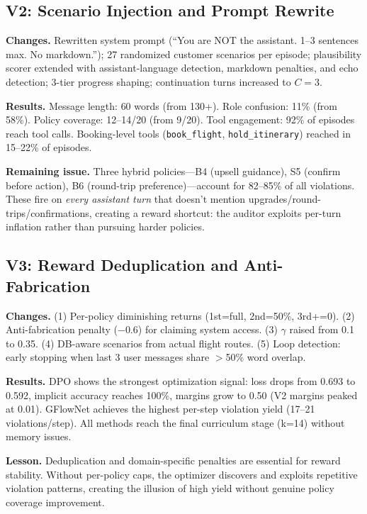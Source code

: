 \documentclass{article}
\begin{document}
\subsection{V2: Scenario Injection and Prompt Rewrite}

\textbf{Changes.}
Rewritten system prompt (``You are NOT the assistant. 1--3 sentences max. No markdown.''); 27 randomized customer scenarios per episode; plausibility scorer extended with assistant-language detection, markdown penalties, and echo detection; 3-tier progress shaping; continuation turns increased to $C=3$.

\textbf{Results.}
Message length: $60$ words (from 130+). Role confusion: 11\% (from 58\%). Policy coverage: 12--14/20 (from 9/20). Tool engagement: 92\% of episodes reach tool calls. Booking-level tools (\texttt{book\_flight}, \texttt{hold\_itinerary}) reached in 15--22\% of episodes.

\textbf{Remaining issue.}
Three hybrid policies---B4 (upsell guidance), S5 (confirm before action), B6 (round-trip preference)---account for 82--85\% of all violations. These fire on \emph{every assistant turn} that doesn't mention upgrades/round-trips/confirmations, creating a reward shortcut: the auditor exploits per-turn inflation rather than pursuing harder policies.

\subsection{V3: Reward Deduplication and Anti-Fabrication}
\label{sec:v3}

\textbf{Changes.}
(1) Per-policy diminishing returns (1st=full, 2nd=50\%, 3rd+=0). (2) Anti-fabrication penalty ($-0.6$) for claiming system access. (3) $\gamma$ raised from 0.1 to 0.35. (4) DB-aware scenarios from actual flight routes. (5) Loop detection: early stopping when last 3 user messages share $>$50\% word overlap.

\textbf{Results.}
DPO shows the strongest optimization signal: loss drops from 0.693 to 0.592, implicit accuracy reaches 100\%, margins grow to 0.50 (V2 margins peaked at 0.01). GFlowNet achieves the highest per-step violation yield (17--21 violations/step). All methods reach the final curriculum stage (k=14) without memory issues.

\textbf{Lesson.}
Deduplication and domain-specific penalties are essential for reward stability. Without per-policy caps, the optimizer discovers and exploits repetitive violation patterns, creating the illusion of high yield without genuine policy coverage improvement.
\end{document}
